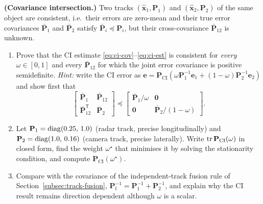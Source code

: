 \begin{prob}\label{prob:ch03:8}
\textbf{(Covariance intersection.)} Two tracks $(\widehat{\mathbf{x}}_1,\mathbf{P}_1)$ and $(\widehat{\mathbf{x}}_2,\mathbf{P}_2)$ of the same object are consistent, i.e.\ their errors are zero-mean and their true error covariances $\bar{\mathbf{P}}_1$ and $\bar{\mathbf{P}}_2$ satisfy $\bar{\mathbf{P}}_i\preceq\mathbf{P}_i$, but their cross-covariance $\bar{\mathbf{P}}_{12}$ is unknown.
\begin{enumerate}
\item[(a)] Prove that the CI estimate \eqref{eq:ci-cov}--\eqref{eq:ci-est} is consistent for \emph{every} $\omega\in[0,1]$ and every $\bar{\mathbf{P}}_{12}$ for which the joint error covariance is positive semidefinite. \emph{Hint:} write the CI error as $\mathbf{e}=\mathbf{P}_{\mathrm{CI}}\left(\omega\mathbf{P}_1^{-1}\mathbf{e}_1+(1-\omega)\mathbf{P}_2^{-1}\mathbf{e}_2\right)$ and show first that
\begin{equation*}
\begin{bmatrix}\bar{\mathbf{P}}_1&\bar{\mathbf{P}}_{12}\\ \bar{\mathbf{P}}_{12}^{\mathsf T}&\bar{\mathbf{P}}_2\end{bmatrix}\preceq\begin{bmatrix}\bar{\mathbf{P}}_1/\omega&\mathbf{0}\\ \mathbf{0}&\bar{\mathbf{P}}_2/(1-\omega)\end{bmatrix}.
\end{equation*}
\item[(b)] Let $\mathbf{P}_1=\operatorname{diag}(0.25,\,1.0)$ (radar track, precise longitudinally) and $\mathbf{P}_2=\operatorname{diag}(1.0,\,0.16)$ (camera track, precise laterally). Write $\operatorname{tr}\mathbf{P}_{\mathrm{CI}}(\omega)$ in closed form, find the weight $\omega^{\star}$ that minimises it by solving the stationarity condition, and compute $\mathbf{P}_{\mathrm{CI}}(\omega^{\star})$.
\item[(c)] Compare with the covariance of the independent-track fusion rule of Section~\ref{subsec:track-fusion}, $\mathbf{P}_{\mathrm{f}}^{-1}=\mathbf{P}_1^{-1}+\mathbf{P}_2^{-1}$, and explain why the CI result remains direction dependent although $\omega$ is a scalar.
\end{enumerate}
\end{prob}

